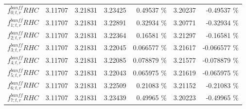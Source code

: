 \begin{table}
\begin{tabular}{| l | r | r | r  r | r  r |}
                                                       $f_{0; t, r}^{banff} RHC$ &         3.11707 & 3.21831 & 3.23425 &         0.49537 \%  &         3.20237 &        -0.49537 \%  \\ 
                                                       $f_{1; t, r}^{banff} RHC$ &         3.11707 & 3.21831 & 3.22891 &         0.32934 \%  &         3.20771 &        -0.32934 \%  \\ 
                                                       $f_{2; t, r}^{banff} RHC$ &         3.11707 & 3.21831 & 3.22364 &         0.16581 \%  &         3.21297 &        -0.16581 \%  \\ 
                                                       $f_{3; t, r}^{banff} RHC$ &         3.11707 & 3.21831 & 3.22045 &        0.066577 \%  &         3.21617 &       -0.066577 \%  \\ 
                                                       $f_{4; t, r}^{banff} RHC$ &         3.11707 & 3.21831 & 3.22085 &        0.078879 \%  &         3.21577 &       -0.078879 \%  \\ 
                                                       $f_{5; t, r}^{banff} RHC$ &         3.11707 & 3.21831 & 3.22043 &        0.065975 \%  &         3.21619 &       -0.065975 \%  \\ 
                                                       $f_{6; t, r}^{banff} RHC$ &         3.11707 & 3.21831 & 3.22509 &         0.21083 \%  &         3.21152 &        -0.21083 \%  \\ 
                                                       $f_{7; t, r}^{banff} RHC$ &         3.11707 & 3.21831 & 3.23439 &         0.49965 \%  &         3.20223 &        -0.49965 \%  \\ 

\end{tabular}
\end{table}

